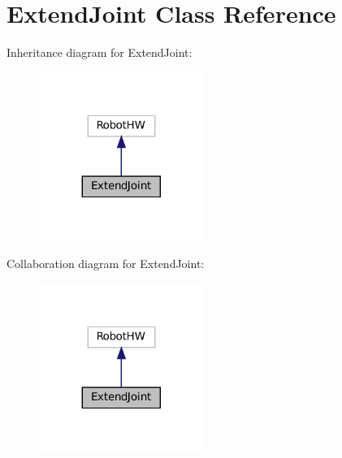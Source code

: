 \hypertarget{classExtendJoint}{}\section{Extend\+Joint Class Reference}
\label{classExtendJoint}


Inheritance diagram for Extend\+Joint\+:\nopagebreak
\begin{figure}[H]
\begin{center}
\leavevmode
\includegraphics[width=152pt]{classExtendJoint__inherit__graph}
\end{center}
\end{figure}


Collaboration diagram for Extend\+Joint\+:\nopagebreak
\begin{figure}[H]
\begin{center}
\leavevmode
\includegraphics[width=152pt]{classExtendJoint__coll__graph}
\end{center}
\end{figure}
